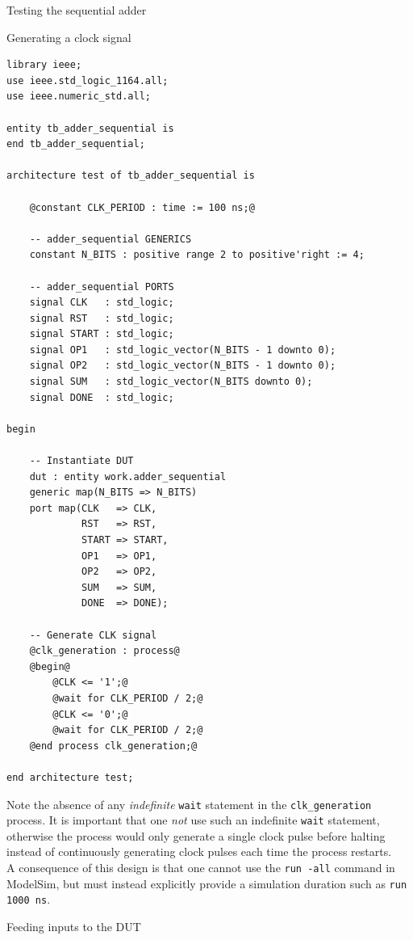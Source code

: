 \documentclass[lab]{course}
\begin{document}
\begin{section}{Testing the sequential adder}
\begin{subsection}{Generating a clock signal}
        \begin{lstlisting}[caption={Add process for generating \texttt{CLK} signal}, label={lst:sequential_process_generate_clk}]
library ieee;
use ieee.std_logic_1164.all;
use ieee.numeric_std.all;

entity tb_adder_sequential is
end tb_adder_sequential;

architecture test of tb_adder_sequential is

    @constant CLK_PERIOD : time := 100 ns;@

    -- adder_sequential GENERICS
    constant N_BITS : positive range 2 to positive'right := 4;

    -- adder_sequential PORTS
    signal CLK   : std_logic;
    signal RST   : std_logic;
    signal START : std_logic;
    signal OP1   : std_logic_vector(N_BITS - 1 downto 0);
    signal OP2   : std_logic_vector(N_BITS - 1 downto 0);
    signal SUM   : std_logic_vector(N_BITS downto 0);
    signal DONE  : std_logic;

begin

    -- Instantiate DUT
    dut : entity work.adder_sequential
    generic map(N_BITS => N_BITS)
    port map(CLK   => CLK,
             RST   => RST,
             START => START,
             OP1   => OP1,
             OP2   => OP2,
             SUM   => SUM,
             DONE  => DONE);

    -- Generate CLK signal
    @clk_generation : process@
    @begin@
        @CLK <= '1';@
        @wait for CLK_PERIOD / 2;@
        @CLK <= '0';@
        @wait for CLK_PERIOD / 2;@
    @end process clk_generation;@

end architecture test;
        \end{lstlisting}

        Note the absence of any \emph{indefinite} \verb+wait+ statement in the \verb+clk_generation+ process. It is important that one \emph{not} use such an indefinite \verb+wait+ statement, otherwise the process would only generate a single clock pulse before halting instead of continuously generating clock pulses each time the process restarts. \\

        A consequence of this design is that one cannot use the \verb+run -all+ command in ModelSim, but must instead explicitly provide a simulation duration such as \verb+run 1000 ns+.
    \end{subsection}

    \begin{subsection}{Feeding inputs to the DUT}


\end{subsection}
\end{section}
\end{document}

